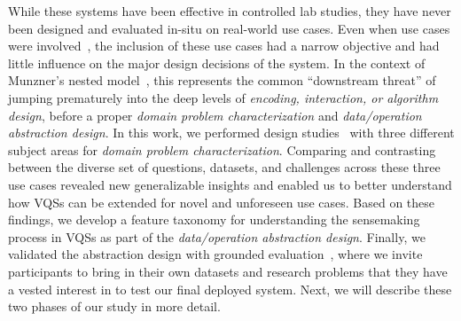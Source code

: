 \par While these systems have been effective in controlled lab studies, they have never been designed and evaluated in-situ on real-world use cases. Even when use cases were involved~\cite{Hochheiser2004,correll2016semantics}, the inclusion of these use cases had a narrow objective and had little influence on the major design decisions of the system. In the context of Munzner's nested model~\cite{munzner2009nested}, this represents the common ``downstream threat'' of jumping prematurely into the deep levels of \textit{encoding, interaction, or algorithm design}, before a proper \textit{domain problem characterization} and \textit{data/operation abstraction design}. In this work, we performed design studies~\cite{lam2012empirical,shneiderman2006strategies,Sedlmair2012} with three different subject areas for \textit{domain problem characterization}. Comparing and contrasting between the diverse set of questions, datasets, and challenges across these three use cases revealed new generalizable insights and enabled us to better understand how VQSs can be extended for novel and unforeseen use cases. Based on these findings, we develop a feature taxonomy for understanding the sensemaking process in VQSs as part of the \textit{data/operation abstraction design}. Finally, we validated the abstraction design with grounded evaluation~\cite{Plaisant2004,Isenberg2008}, where we invite participants to bring in their own datasets and research problems that they have a vested interest in to test our final deployed system. Next, we will describe these two phases of our study in more detail.

